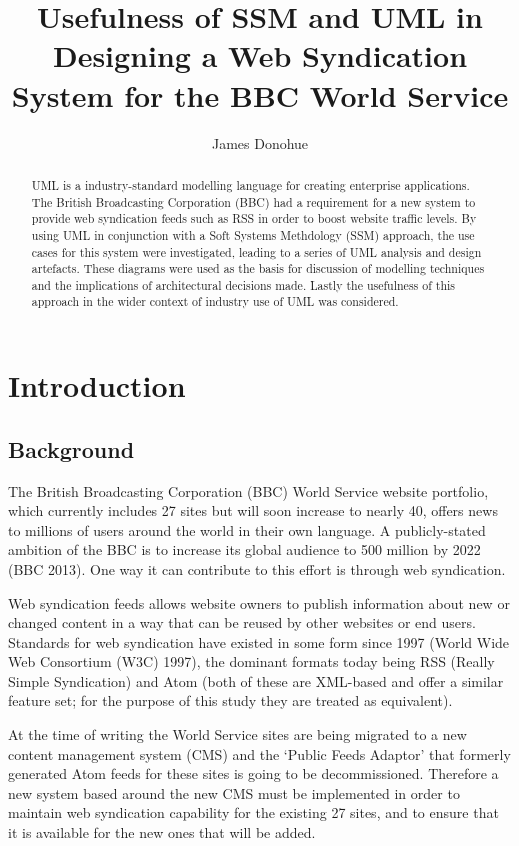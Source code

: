 \documentclass[a4paper]{article}
\begin{document}
\title{Usefulness of SSM and UML in Designing a Web Syndication System for the BBC World Service}
\author{James Donohue}

\maketitle

\begin{abstract}
UML\cite{omg2011} is a industry-standard modelling language for creating enterprise applications. The British Broadcasting Corporation (BBC) had a requirement for a new system to provide web syndication feeds such as RSS in order to boost website traffic levels. By using UML in conjunction with a Soft Systems Methdology (SSM) approach, the use cases for this system were investigated, leading to a series of UML analysis and design artefacts. These diagrams were used as the basis for discussion of modelling techniques and the implications of architectural decisions made. Lastly the usefulness of this approach in the wider context of industry use of UML was considered.
\end{abstract}

\section{Introduction}
\subsection{Background}

The British Broadcasting Corporation (BBC) World Service website portfolio, which currently includes 27 sites but will soon increase to nearly 40, offers news to millions of users around the world in their own language. A publicly-stated ambition of the BBC is to increase its global audience to 500 million by 2022 (BBC 2013). One way it can contribute to this effort is through web syndication.

Web syndication feeds allows website owners to publish information about new or changed content in a way that can be reused by other websites or end users. Standards for web syndication have existed in some form since 1997 (World Wide Web Consortium (W3C) 1997), the dominant formats today being RSS (Really Simple Syndication) and Atom (both of these are XML-based and offer a similar feature set; for the purpose of this study they are treated as equivalent).

At the time of writing the World Service sites are being migrated to a new content management system (CMS) and the `Public Feeds Adaptor' that formerly generated Atom feeds for these sites is going to be decommissioned. Therefore a new system based around the new CMS must be implemented in order to maintain web syndication capability for the existing 27 sites, and to ensure that it is available for the new ones that will be added.
\end{document}
